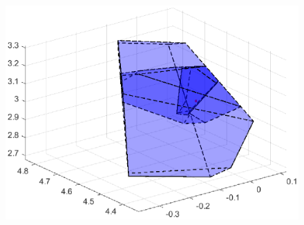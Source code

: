 \begin{frame}
\begin{columns}
\begin{figure}
\begin{overprint}
    \includegraphics[scale=0.5]{Images/polyhdr3.eps}
    \end{overprint}
\end{figure}
\end{columns}
\end{frame}
